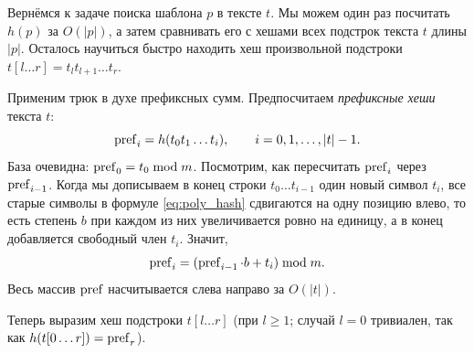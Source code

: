 Вернёмся к задаче поиска шаблона $p$ в тексте $t$. Мы можем один раз посчитать $h(p)$ за $O(|p|)$, а затем сравнивать его с хешами всех подстрок текста $t$ длины $|p|$. Осталось научиться быстро находить хеш произвольной подстроки $t[l \dots r] = t_l t_{l+1} \dots t_r$.

Применим трюк в духе префиксных сумм. Предпосчитаем \textit{префиксные хеши} текста $t$:
\[
    \operatorname{pref}_i = h(t_0 t_1 \dots t_i), \qquad i = 0, 1, \dots, |t| - 1.
\]
База очевидна: $\operatorname{pref}_0 = t_0 \bmod m$. Посмотрим, как пересчитать $\operatorname{pref}_i$ через $\operatorname{pref}_{i-1}$. Когда мы дописываем в конец строки $t_0 \dots t_{i-1}$ один новый символ $t_i$, все старые символы в формуле \eqref{eq:poly_hash} сдвигаются на одну позицию влево, то есть степень $b$ при каждом из них увеличивается ровно на единицу, а в конец добавляется свободный член $t_i$. Значит,
\[
    \operatorname{pref}_i = (\operatorname{pref}_{i-1} \cdot b + t_i) \bmod m.
\]
Весь массив $\operatorname{pref}$ насчитывается слева направо за $O(|t|)$.

Теперь выразим хеш подстроки $t[l \dots r]$ (при $l \ge 1$; случай $l = 0$ тривиален, так как $h(t[0 \dots r]) = \operatorname{pref}_r$).

\begin{center}
\end{center}

